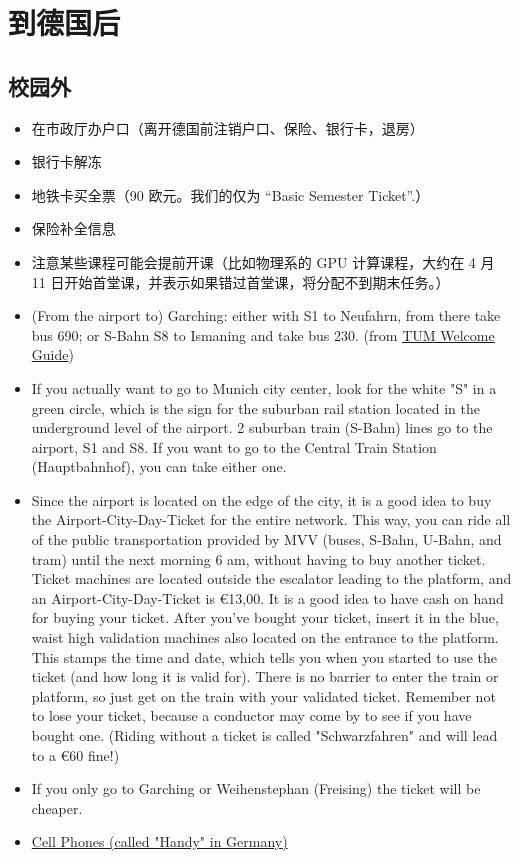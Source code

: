 \documentclass[oneside,final]{book}
\begin{document}
\chapter{到德国后}\label{chap:in-Germany}
\section{校园外}
\begin{itemize}
  \item 在市政厅办户口（离开德国前注销户口、保险、银行卡，退房）
  \item 银行卡解冻
  \item 地铁卡买全票（90 欧元。我们的仅为 ``Basic Semester Ticket''.）
  \item 保险补全信息
  \item 注意某些课程可能会提前开课（比如物理系的 GPU 计算课程，大约在 4 月 11 日开始首堂课，并表示如果错过首堂课，将分配不到期末任务。）
  \item (From the airport to) {\color{blue}Garching}: either with S1 to Neufahrn, from there take bus 690; or S-Bahn S8 to Ismaning and take bus 230. (from \href{https://distributed-campus.org/tumwelcomeguide/portal/media-type/html/language/en/role/student/page/default.psml/js_panename/DCContentObjectAusgabe/language/en/idgroup/19/id/96/typ/text}{TUM Welcome Guide})
  \item If you actually want to go to {\color{blue}Munich city center}, look for the white "S" in a green circle, which is the sign for the suburban rail station located in the underground level of the airport. 2 suburban train (S-Bahn) lines go to the airport, {\color{blue}S1 and S8}. If you want to go to the Central Train Station (Hauptbahnhof), you can take either one.
  \item Since the airport is located on the edge of the city, it is a good idea to buy the {\color{blue}Airport-City-Day-Ticket} for the entire network. This way, you can ride all of the public transportation provided by MVV (buses, S-Bahn, U-Bahn, and tram) until the next morning 6 am, without having to buy another ticket. Ticket machines are located outside the escalator leading to the platform, and an Airport-City-Day-Ticket is \euro{13,00}. It is a good idea to have cash on hand for buying your ticket. After you've bought your ticket, insert it in the blue, waist high validation machines also located on the entrance to the platform. This stamps the time and date, which tells you when you started to use the ticket (and how long it is valid for). There is no barrier to enter the train or platform, so just get on the train with your validated ticket. Remember not to lose your ticket, because a conductor may come by to see if you have bought one. (Riding without a ticket is called "Schwarzfahren" and will lead to a \euro{60} fine!)
  \item If you only go to Garching or Weihenstephan (Freising) the ticket will be cheaper.
  \item \href{https://distributed-campus.org/tumwelcomeguide/portal/media-type/html/language/en/role/student/page/default.psml/js_panename/DCContentObjectAusgabe/language/en/idgroup/19/id/111/typ/text}{Cell Phones (called "Handy" in Germany)}
\end{itemize}
\end{document}
